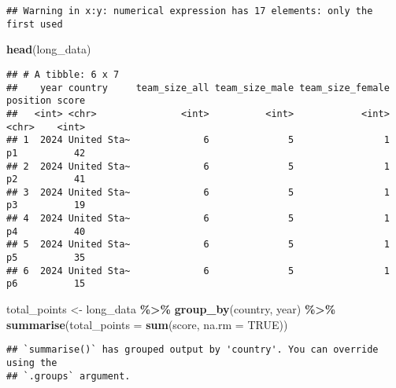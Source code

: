 \documentclass[
]{article}
\newenvironment{Shaded}{\begin{snugshade}}{\end{snugshade}}
\newcommand{\AttributeTok}[1]{\textcolor[rgb]{0.13,0.29,0.53}{#1}}
\newcommand{\ConstantTok}[1]{\textcolor[rgb]{0.56,0.35,0.01}{#1}}
\newcommand{\FunctionTok}[1]{\textcolor[rgb]{0.13,0.29,0.53}{\textbf{#1}}}
\newcommand{\NormalTok}[1]{#1}
\newcommand{\OtherTok}[1]{\textcolor[rgb]{0.56,0.35,0.01}{#1}}
\newcommand{\SpecialCharTok}[1]{\textcolor[rgb]{0.81,0.36,0.00}{\textbf{#1}}}
\begin{document}
\begin{verbatim}
## Warning in x:y: numerical expression has 17 elements: only the first used
\end{verbatim}

\begin{Shaded}
\begin{Highlighting}[]
\FunctionTok{head}\NormalTok{(long\_data)}
\end{Highlighting}
\end{Shaded}

\begin{verbatim}
## # A tibble: 6 x 7
##    year country     team_size_all team_size_male team_size_female position score
##   <int> <chr>               <int>          <int>            <int> <chr>    <int>
## 1  2024 United Sta~             6              5                1 p1          42
## 2  2024 United Sta~             6              5                1 p2          41
## 3  2024 United Sta~             6              5                1 p3          19
## 4  2024 United Sta~             6              5                1 p4          40
## 5  2024 United Sta~             6              5                1 p5          35
## 6  2024 United Sta~             6              5                1 p6          15
\end{verbatim}

\begin{Shaded}
\begin{Highlighting}[]
\NormalTok{total\_points }\OtherTok{\textless{}{-}}\NormalTok{ long\_data }\SpecialCharTok{\%\textgreater{}\%}
  \FunctionTok{group\_by}\NormalTok{(country, year) }\SpecialCharTok{\%\textgreater{}\%}
  \FunctionTok{summarise}\NormalTok{(}\AttributeTok{total\_points =} \FunctionTok{sum}\NormalTok{(score, }\AttributeTok{na.rm =} \ConstantTok{TRUE}\NormalTok{))}
\end{Highlighting}
\end{Shaded}

\begin{verbatim}
## `summarise()` has grouped output by 'country'. You can override using the
## `.groups` argument.
\end{verbatim}
\end{document}
